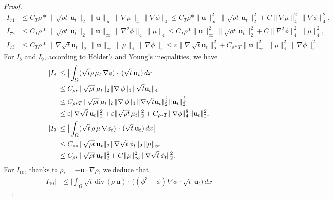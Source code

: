 \documentclass[11pt]{article}
\numberwithin{equation}{section}
\begin{document}
\begin{proof}
\begin{align*}
I_{71} &\leq C_{T} \rho * \, \|\sqrt{\rho t} \, \mathbf{u}_t\|_2 \, \|\mathbf{u}\|_{\infty} \, \|\nabla \mu\|_4 \, \|\nabla \phi\|_4 \leq  C_{T} \rho *\|\mathbf{u}\|_{\infty}^2 \, \|\sqrt{\rho t} \, \mathbf{u}_t\|_2^2 + C\|\nabla \mu\|_4^2 \, \|\nabla \phi\|_4^2, \\
I_{72} &\leq C_{T} \rho * \, \|\sqrt{\rho t} \, \mathbf{u}_t\|_2 \, \|\mathbf{u}\|_{\infty} \, \|\nabla^2 \phi\|_4 \, \| \mu\|_4 \leq  C_{T} \rho *\|\mathbf{u}\|_{\infty}^2 \, \|\sqrt{\rho t} \, \mathbf{u}_t\|_2^2 + C\|\nabla^2 \phi\|_4^2 \, \| \mu\|_4^2, \\
I_{73} &\leq C_{T} \rho *  \, \|\nabla \sqrt t\mathbf{u}_t\|_2 \, \|\mathbf{u}\|_{\infty} \, \|\mu\|_4 \, \|\nabla \phi\|_4 \leq \varepsilon \|\nabla\, \sqrt t \mathbf{u}_t\|_2^2 + C_{\rho*T} \|\mathbf{u}\|_{\infty}^2 \, \|\mu\|_4^2 \, \|\nabla \phi\|_4^2.
\end{align*}
For \( I_8\) and \( I_9\),  according to H\"{o}lder's and Young's inequalities,  we have
\begin{align}
|I_8| &\leq \big| \int_{\Omega} ( \sqrt{t}\rho \, \mu_t \, \nabla \phi) \cdot\, (\sqrt{t} \, \mathbf{u}_t) \, dx \big|\notag
\\& \leq C_{\rho*} \, \|\sqrt{\rho t} \, \mu_t\|_2 \, \|\nabla \, \phi\|_4 \, \|\sqrt{t}\mathbf{u}_t\|_4\\ \notag
&\leq C_{\rho*T} \, \|\sqrt{\rho t} \, \mu_t\|_2 \, \|\nabla \, \phi\|_4 \, \|\nabla\sqrt{t}\mathbf{u}_t\|_2^\frac{3}{4}\|\mathbf{u}_t\|_2^\frac{1}{4}\notag\\
 &\leq \varepsilon\|\nabla \sqrt{t} \, \mathbf{u}_t\|_2^2 +\varepsilon\|\sqrt{\rho t} \, \mu_t\|_2^2 + C_{\rho*T} \, \|\nabla \phi\|_4^8 \, \|\mathbf{u}_t\|_2^2,\notag\\
|I_9| &\leq \big| \int_{\Omega} (\sqrt{t} \, \rho \, \mu \, \nabla \phi_t) \,\cdot (\sqrt{t} \, \mathbf{u}_t) \, dx \big| \notag\\&\leq C_{\rho*} \, \|\sqrt{\rho t} \, \mathbf{u}_t\|_2 \, \|\nabla \sqrt{t} \, \phi_t\|_2 \, \|\mu\|_{\infty} \\ \notag
&\leq C_{\rho*} \, \|\sqrt{\rho t} \, \mathbf{u}_t\|_2^2 + C\|\mu\|_{\infty}^2 \, \|\nabla \sqrt{t} \, \phi_t\|_2^2 .
\end{align}
For \( I_{10} \), thanks to \( \rho_t = - \mathbf{u} \cdot \nabla \rho \), we deduce that
\begin{equation}
\begin{split}\label{3.1444}
|I_{10}| &\leq \big| \int_{\Omega} \sqrt{t} \, \text{div} \, (\rho \, \mathbf{u}) \cdot\,\bigl((\phi^3 - \phi) \, \nabla \phi \,\cdot \sqrt{t} \, \mathbf{u}_t\bigr) \, dx \big|

\end{split}
\end{equation}
\end{proof}
\end{document}
